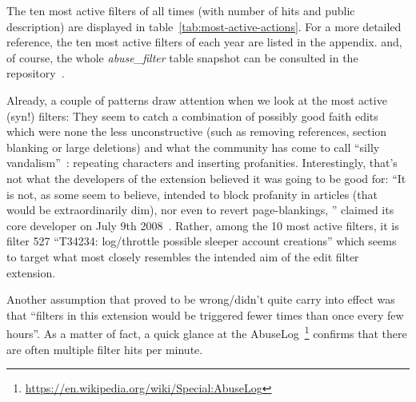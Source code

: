 \begin{comment}
    \item has the willingness of the community to use filters increased over time?: looking at aggregated values of number of triggered filters per year, the answer is rather it's quite constant; TODO: plot it at a finer granularity
        when aggregating filter triggers per month, one notices that there's an overall slight upward tendency.
\end{comment}

The ten most active filters of all times (with number of hits and public description) are displayed in table~\ref{tab:most-active-actions}.
For a more detailed reference, the ten most active filters of each year are listed in the appendix. %
and, of course, the whole \emph{abuse\_filter} table snapshot can be consulted in the repository~\cite{github}.

Already, a couple of patterns draw attention when we look at the most active (syn!) filters:
They seem to catch a combination of possibly good faith edits which were none the less unconstructive (such as removing references, section blanking or large deletions)
and what the community has come to call ``silly vandalism''~\cite{Wikipedia:VandalismTypes}: repeating characters and inserting profanities.
Interestingly, that's not what the developers of the extension believed it was going to be good for:
``It is not, as some seem to believe, intended to block profanity in articles (that would be extraordinarily dim), nor even to revert page-blankings, '' claimed its core developer on July 9th 2008~\cite{Wikipedia:EditFilterTalkArchive1}.
Rather, among the 10 most active filters, it is filter 527 ``T34234: log/throttle possible sleeper account creations'' which seems to target what most closely resembles the intended aim of the edit filter extension. %

Another assumption that proved to be wrong/didn't quite carry into effect was that ``filters in this extension would be triggered fewer times than once every few hours''.
As a matter of fact, a quick glance at the AbuseLog~\footnote{\url{https://en.wikipedia.org/wiki/Special:AbuseLog}} confirms that there are often multiple filter hits per minute.

